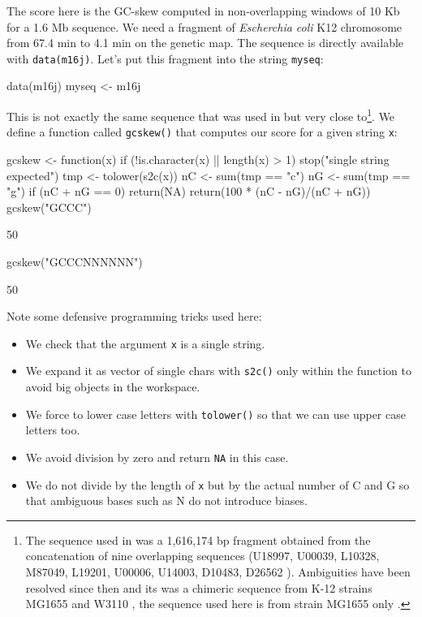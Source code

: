 \documentclass{article}
\begin{document}
The score here is the GC-skew computed in non-overlapping
windows of 10 Kb for a 1.6 Mb sequence.
We need a fragment of \textit{Escherchia coli} K12 chromosome from
67.4 min to 4.1 min on the genetic map. The sequence is directly available 
with \texttt{data(m16j)}. Let's put this fragment into the string \texttt{myseq}:

\begin{Schunk}
\begin{Sinput}
 data(m16j)
 myseq <- m16j
\end{Sinput}
\end{Schunk}

This is not exactly the same sequence that was used in \cite{LobryMBE96}
but very close to\footnote{
The sequence used in \cite{LobryMBE96} was a 1,616,174 bp fragment obtained
from the concatenation of nine overlapping sequences
(U18997, U00039, L10328, M87049, L19201, U00006, U14003, D10483, D26562
\cite{SofiaHJ1994, BurlandV1993, DanielsDL1992, PlunkettG1993, BlattnerFR1993, YuraT1992}).
Ambiguities have been resolved since then and its was a chimeric sequence
from K-12 strains MG1655 and W3110 \cite{HayashiK2006}, the sequence used here
is from strain MG1655 only \cite{BlattnerFR1997}. 
}. We define a function called \texttt{gcskew()} that computes our score 
for a given string \texttt{x}:

\begin{Schunk}
\begin{Sinput}
 gcskew <- function(x) {
     if (!is.character(x) || length(x) > 1) 
         stop("single string expected")
     tmp <- tolower(s2c(x))
     nC <- sum(tmp == "c")
     nG <- sum(tmp == "g")
     if (nC + nG == 0) 
         return(NA)
     return(100 * (nC - nG)/(nC + nG))
 }
 gcskew("GCCC")
\end{Sinput}
\begin{Soutput}
[1] 50
\end{Soutput}
\begin{Sinput}
 gcskew("GCCCNNNNNN")
\end{Sinput}
\begin{Soutput}
[1] 50
\end{Soutput}
\end{Schunk}

Note some defensive programming tricks used here:

\begin{itemize}
\item We check that the argument \texttt{x} is a single string.
\item We expand it as vector of single chars with \texttt{s2c()} only within the
      function to avoid big objects in the workspace.
\item We force to lower case letters with \texttt{tolower()} so that we can use 
      upper case letters too.
\item We avoid division by zero and return \texttt{NA} in this case.
\item We do not divide by the length of \texttt{x} but by the actual number
      of C and G so that ambiguous bases such as N do not introduce biases.
\end{itemize}
\end{document}
